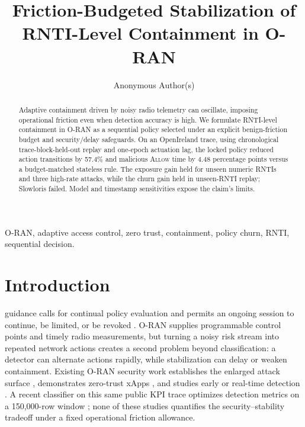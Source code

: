 \documentclass[journal,10pt]{IEEEtran}
\newcommand{\Allow}{\textsc{Allow}}
\begin{document}
\title{Friction-Budgeted Stabilization of RNTI-Level Containment in O-RAN}

\author{Anonymous Author(s)}

\maketitle

\begin{abstract}
Adaptive containment driven by noisy radio telemetry can oscillate, imposing operational friction even when detection accuracy is high. We formulate RNTI-level containment in O-RAN as a sequential policy selected under an explicit benign-friction budget and security/delay safeguards. On an OpenIreland trace, using chronological trace-block-held-out replay and one-epoch actuation lag, the locked policy reduced action transitions by 57.4\% and malicious \Allow{} time by 4.48 percentage points versus a budget-matched stateless rule. The exposure gain held for unseen numeric RNTIs and three high-rate attacks, while the churn gain held in unseen-RNTI replay; Slowloris failed. Model and timestamp sensitivities expose the claim's limits.
\end{abstract}

\begin{IEEEkeywords}
O-RAN, adaptive access control, zero trust, containment, policy churn, RNTI, sequential decision.
\end{IEEEkeywords}

\section{Introduction}
 guidance calls for continual policy evaluation and permits an ongoing session to continue, be limited, or be revoked \cite{nist800207,nist180035}. O-RAN supplies programmable control points and timely radio measurements, but turning a noisy risk stream into repeated network actions creates a second problem beyond classification: a detector can alternate actions rapidly, while stabilization can delay or weaken containment. Existing O-RAN security work establishes the enlarged attack surface \cite{liyanage2023}, demonstrates zero-trust xApps \cite{abdalla2024ztran}, and studies early or real-time detection \cite{xavier2023early,scalingi2024detran}. A recent classifier on this same public KPI trace optimizes detection metrics on a 150,000-row window \cite{lee2025}; none of these studies quantifies the security--stability tradeoff under a fixed operational friction allowance.
\end{document}
